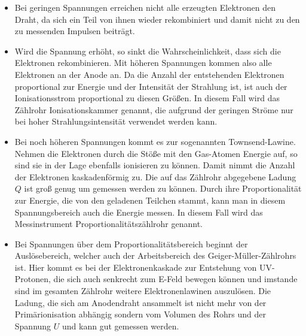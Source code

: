 \begin{itemize}
  \item Bei geringen Spannungen erreichen nicht alle erzeugten Elektronen den Draht, da sich ein Teil von ihnen wieder rekombiniert und damit nicht zu den zu messenden Impulsen beiträgt.
  \item Wird die Spannung erhöht, so sinkt die Wahrscheinlichkeit, dass sich die Elektronen rekombinieren. Mit höheren Spannungen kommen also alle Elektronen an der Anode an. Da die Anzahl der entstehenden Elektronen proportional zur Energie und der 
        Intensität der Strahlung ist, ist auch der Ionisationsstrom proportional zu diesen Größen. In diesem Fall wird das Zählrohr Ionisationskammer genannt, die aufgrund der geringen Ströme nur bei hoher Strahlungsintensität verwendet werden kann.
  \item Bei noch höheren Spannungen kommt es zur sogenannten Townsend-Lawine. Nehmen die Elektronen durch die Stöße mit den Gas-Atomen Energie auf, so sind sie in der Lage ebenfalls ionisieren zu können. Damit nimmt die Anzahl der Elektronen 
        kaskadenförmig zu. Die auf das Zählrohr abgegebene Ladung $Q$ ist groß genug um gemessen werden zu können. Durch ihre Proportionalität zur Energie, die von den geladenen Teilchen stammt, kann man in diesem Spannungsbereich auch die Energie messen.
		In diesem Fall wird das Messinstrument Proportionalitätszählrohr genannt.
  \item Bei Spannungen über dem Proportionalitätsbereich beginnt der Auslösebereich, welcher auch der Arbeitsbereich des Geiger-Müller-Zählrohrs ist. Hier kommt es bei der Elektronenkaskade zur Entstehung von UV-Protonen, die sich auch senkrecht zum 
        E-Feld bewegen können und imstande sind im gesamten Zählrohr weitere Elektronenlawinen auszulösen. Die Ladung, die sich am Anodendraht ansammelt ist nicht mehr von der Primärionisation abhängig sondern vom Volumen des Rohrs und der Spannung $U$ und
		kann gut gemessen werden.
		
\end{itemize}

